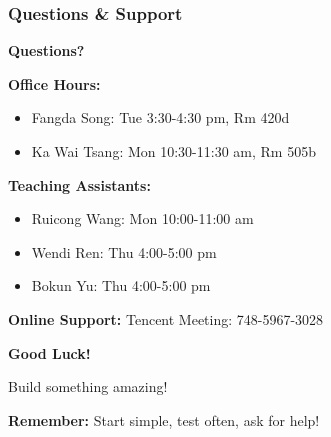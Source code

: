 \documentclass[aspectratio=169]{beamer}
\begin{document}
\begin{frame}
\frametitle{Questions \& Support}
\begin{center}
\Large \textbf{Questions?}

\vspace{1em}

\textbf{Office Hours:}
\begin{itemize}
\item Fangda Song: Tue 3:30-4:30 pm, Rm 420d
\item Ka Wai Tsang: Mon 10:30-11:30 am, Rm 505b
\end{itemize}

\vspace{1em}

\textbf{Teaching Assistants:}
\begin{itemize}
\item Ruicong Wang: Mon 10:00-11:00 am
\item Wendi Ren: Thu 4:00-5:00 pm
\item Bokun Yu: Thu 4:00-5:00 pm
\end{itemize}

\vspace{1em}

\textbf{Online Support:}
Tencent Meeting: 748-5967-3028
\end{center}
\end{frame}

\begin{frame}
\begin{center}
\Huge \textbf{Good Luck!}

\vspace{1em}

\Large Build something amazing!

\vspace{2em}

\textbf{Remember:} Start simple, test often, ask for help!
\end{center}
\end{frame}
\end{document}
